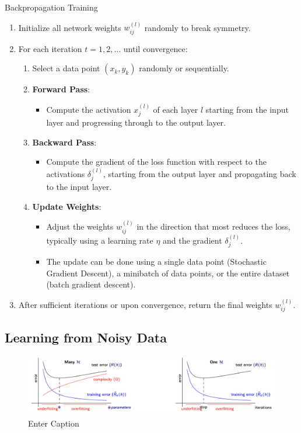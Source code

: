 \begin{definitionbox}{Backpropagation Training }
\begin{enumerate}
    \item Initialize all network weights \( w_{ij}^{(l)} \) randomly to break symmetry.
    \item For each iteration \( t = 1, 2, \ldots \) until convergence:
    \begin{enumerate}
        \item Select a data point \( (x_k, y_k) \) randomly or sequentially.
        \item \textbf{Forward Pass}:
        \begin{itemize}
            \item Compute the activation \( x_j^{(l)} \) of each layer \( l \) starting from the input layer and progressing through to the output layer.
        \end{itemize}
        \item \textbf{Backward Pass}:
        \begin{itemize}
            \item Compute the gradient of the loss function with respect to the activations \( \delta_j^{(l)} \), starting from the output layer and propagating back to the input layer.
        \end{itemize}
        \item \textbf{Update Weights}:
        \begin{itemize}
            \item Adjust the weights \( w_{ij}^{(l)} \) in the direction that most reduces the loss, typically using a learning rate \( \eta \) and the gradient \( \delta_j^{(l)} \).
            \item The update can be done using a single data point (Stochastic Gradient Descent), a minibatch of data points, or the entire dataset (batch gradient descent).
        \end{itemize}
    \end{enumerate}
    \item After sufficient iterations or upon convergence, return the final weights \( w_{ij}^{(l)} \).
\end{enumerate}
    
\end{definitionbox}

\subsection{Learning from Noisy Data}
\begin{figure}[H]
    \centering
    \includegraphics[width=0.5\linewidth]{img/learning_curve.png}
    \caption{Enter Caption}
    
\end{figure}

